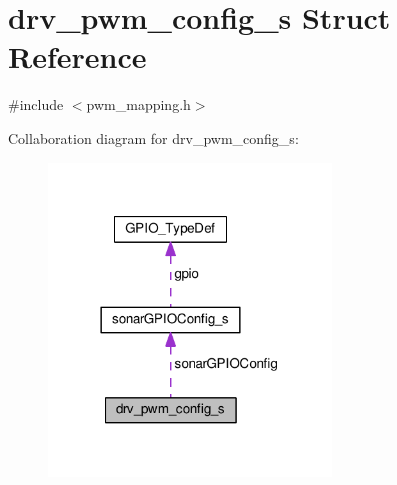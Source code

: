 \hypertarget{structdrv__pwm__config__s}{\section{drv\+\_\+pwm\+\_\+config\+\_\+s Struct Reference}
\label{structdrv__pwm__config__s}
}


{\ttfamily \#include $<$pwm\+\_\+mapping.\+h$>$}



Collaboration diagram for drv\+\_\+pwm\+\_\+config\+\_\+s\+:\nopagebreak
\begin{figure}[H]
\begin{center}
\leavevmode
\includegraphics[width=213pt]{structdrv__pwm__config__s__coll__graph}
\end{center}
\end{figure}
